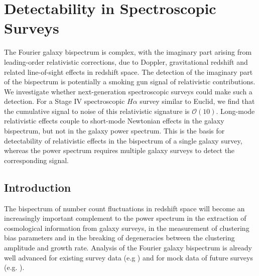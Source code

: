 \chapter{Detectability in Spectroscopic Surveys}
\label{chapter:snreuclid}
%
The Fourier galaxy bispectrum is complex, with the imaginary part arising from leading-order relativistic corrections, due to Doppler, gravitational redshift  and related line-of-sight effects  in redshift space. The detection of the imaginary  part of the bispectrum is potentially a smoking gun signal of relativistic contributions.  We investigate whether next-generation spectroscopic surveys could make such a detection. For a Stage IV spectroscopic $H\alpha$ survey similar to Euclid, we find that  the cumulative signal to noise of this relativistic signature  is $\mathcal{O}(10)$. 
{Long-mode relativistic effects couple to  short-mode Newtonian effects in the galaxy bispectrum, but not in the galaxy power spectrum.
This is  the basis for detectability of relativistic effects in the bispectrum of a single galaxy survey, whereas the power spectrum requires multiple galaxy surveys to detect the corresponding signal.}
%
%
%
%
\section{Introduction}
%
The bispectrum of number count fluctuations in redshift space will become an increasingly important complement to the power spectrum in the extraction of cosmological information from galaxy surveys, 
{in the measurement of {clustering} bias parameters and in the breaking of degeneracies between the clustering amplitude and growth rate.}
Analysis of the Fourier galaxy bispectrum is already well advanced for existing survey data (e.g \cite{Gil-Marin:2016wya,Sugiyama:2018yzo}) and for mock data of future surveys (e.g. \cite{Karagiannis:2018jdt,Yankelevich:2018uaz,Oddo:2019run,Sugiyama:2019ike}).  

